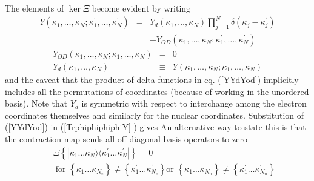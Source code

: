 The elements of $\ker \Xi $ become evident by writing %
\begin{eqnarray}
Y(\kappa _{1},\ldots ,\kappa _{N};\kappa _{1}^{\prime },\ldots ,\kappa
_{N}^{\prime })& =&Y_{d}(\kappa _{1},\ldots ,\kappa
_{N})\prod_{j=1}^{N}\delta (\kappa _{j}-\kappa _{j}^{\prime })  \nonumber \\
&& +Y_{OD}(\kappa _{1},\ldots ,\kappa _{N};\kappa _{1}^{\prime },\ldots
,\kappa _{N}^{\prime })   \label{YYdYod}
\end{eqnarray}
\begin{eqnarray}
Y_{OD}(\kappa _{1},\ldots ,\kappa _{N};\kappa _{1},\ldots ,\kappa _{N}) &=&0
\nonumber \\
Y_{d}(\kappa _{1},\ldots ,\kappa _{N}) &\equiv &Y(\kappa _{1},\ldots ,\kappa
_{N};\kappa _{1},\ldots ,\kappa _{N})
\end{eqnarray}%
and the caveat that the product of delta functions in eq. (\ref{YYdYod})
implicitly includes all the permutations of coordinates (because of working
in the unordered basis). Note that $Y_{d}$ is symmetric with respect to
interchange among the electron coordinates themselves and similarly for the
nuclear coordinates. Substitution of (\ref{YYdYod}) in (\ref{TrphiphiphiphiY}%
) gives %
An alternative way to state this is that the contraction map sends all
off-diagonal basis operators to zero 
\begin{eqnarray}
&&\Xi \left\{ |\kappa _{1}\ldots \kappa _{N}\rangle \langle \kappa
_{1}^{\prime }\ldots \kappa _{N}^{\prime }|\right\} =0  \nonumber \\
&&\;\text{{for }}\left\{ \kappa _{1}\ldots \kappa _{N_{e}}\right\} \neq
\left\{ \kappa _{1}^{\prime }\ldots \kappa _{N_{e}}^{\prime }\right\} \text{
or }\left\{ \kappa _{1}\ldots \kappa _{N_{n}}\right\} \neq \left\{ \kappa
_{1}^{\prime }\ldots \kappa _{N_{n}}^{\prime }\right\}  \label{zeroeta}
\end{eqnarray}

